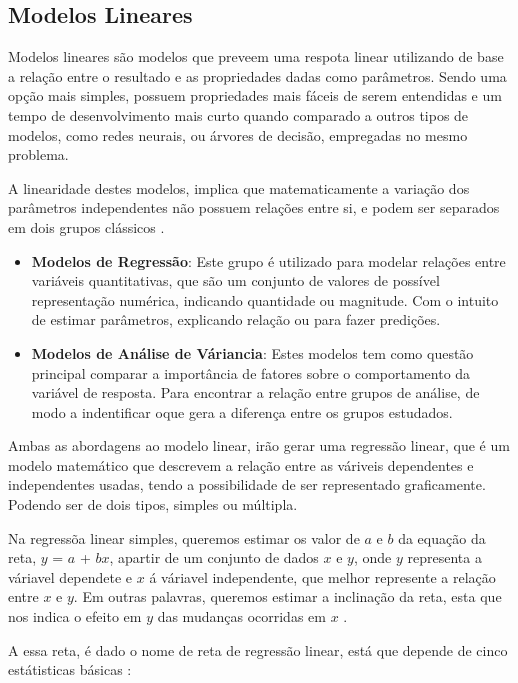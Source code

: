 \documentclass[
	12pt,				%
	openright,			%
	oneside,			%
	a4paper,			%
	english,			%
	brazil				%
	]{abntex2}
\begin{document}
\subsection{Modelos Lineares}

Modelos lineares são modelos que preveem uma respota linear utilizando de base a relação entre o resultado
e as propriedades dadas como parâmetros. Sendo uma opção mais simples, possuem propriedades mais fáceis de
serem entendidas e um tempo de desenvolvimento mais curto quando comparado a outros tipos de modelos,
como redes neurais, ou árvores de decisão, empregadas no mesmo problema. \cite{modelos_lineares}

A linearidade destes modelos, implica que matematicamente a variação dos parâmetros independentes não
possuem relações entre si, e podem ser separados em dois grupos clássicos \cite{tipos_modelos_lineares}.
\begin{itemize}
	\item \textbf{Modelos de Regressão}:
	Este grupo é utilizado para modelar relações entre variáveis quantitativas, que são um conjunto de
	valores de possível representação numérica, indicando quantidade ou magnitude. Com o intuito de estimar
	parâmetros, explicando relação ou para fazer predições.
	\item \textbf{Modelos de Análise de Váriancia}:
	Estes modelos tem como questão principal comparar a importância de fatores sobre o comportamento da
	variável de resposta. Para encontrar a relação entre grupos de análise, de modo a indentificar oque
	gera a diferença entre os grupos estudados.
\end{itemize}

Ambas as abordagens ao modelo linear, irão gerar uma regressão linear, que é um modelo matemático que 
descrevem a relação entre as váriveis dependentes e independentes usadas, tendo a possibilidade de ser
representado graficamente. Podendo ser de dois tipos, simples ou múltipla.

Na regressõa linear simples, queremos estimar os valor de $a$ e $b$ da equação da reta, $y$ = $a$ + $bx$, 
apartir de um conjunto de dados $x$ e $y$, onde $y$ representa a váriavel dependete e $x$ á váriavel 
independente, que melhor represente a relação entre $x$ e $y$. Em outras palavras, queremos estimar a 
inclinação da reta, esta que nos indica o efeito em $y$ das mudanças ocorridas em $x$ 
\cite{modelos_regressao_linear}.

A essa reta, é dado o nome de reta de regressão linear, está que depende de cinco estátisticas básicas
\cite{modelos_regressao_linear}:
\end{document}
